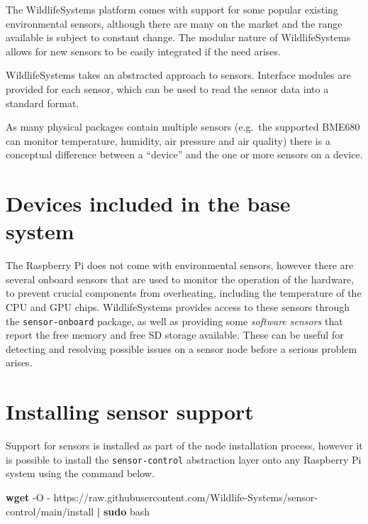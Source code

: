 \documentclass[
]{book}
\newenvironment{Shaded}{\begin{snugshade}}{\end{snugshade}}
\newcommand{\AttributeTok}[1]{\textcolor[rgb]{0.13,0.29,0.53}{#1}}
\newcommand{\FunctionTok}[1]{\textcolor[rgb]{0.13,0.29,0.53}{\textbf{#1}}}
\newcommand{\KeywordTok}[1]{\textcolor[rgb]{0.13,0.29,0.53}{\textbf{#1}}}
\newcommand{\NormalTok}[1]{#1}
\begin{document}
The WildlifeSystems platform comes with support for some popular existing environmental sensors, although there are many on the market and the range available is subject to constant change. The modular nature of WildlifeSystems allows for new sensors to be easily integrated if the need arises.

WildlifeSystems takes an abstracted approach to sensors. Interface modules are provided for each sensor, which can be used to read the sensor data into a standard format.

As many physical packages contain multiple sensors (e.g.~the supported BME680 can monitor temperature, humidity, air pressure and air quality) there is a conceptual difference between a ``device'' and the one or more sensors on a device.

\section{Devices included in the base system}\label{devices-included-in-the-base-system}

The Raspberry Pi does not come with environmental sensors, however there are several onboard sensors that are used to monitor the operation of the hardware, to prevent crucial components from overheating, including the temperature of the CPU and GPU chips. WildlifeSystems provides access to these sensors through the \texttt{sensor-onboard} package, as well as providing some \emph{software sensors} that report the free memory and free SD storage available. These can be useful for detecting and resolving possible issues on a sensor node before a serious problem arises.

\section{Installing sensor support}\label{installing-sensor-support}

Support for sensors is installed as part of the node installation process, however it is possible to install the \texttt{sensor-control} abstraction layer onto any Raspberry Pi system using the command below.

\begin{Shaded}
\begin{Highlighting}[]
\FunctionTok{wget} \AttributeTok{{-}O} \AttributeTok{{-}}\NormalTok{ https://raw.githubusercontent.com/Wildlife{-}Systems/sensor{-}control/main/install }\KeywordTok{|} \FunctionTok{sudo}\NormalTok{ bash}
\end{Highlighting}
\end{Shaded}
\end{document}
